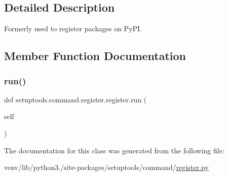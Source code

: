 \subsection{Detailed Description}
\begin{DoxyVerb}Formerly used to register packages on PyPI.\end{DoxyVerb}
 

\subsection{Member Function Documentation}
\mbox{\label{classsetuptools_1_1command_1_1register_1_1register_a621e5757f6735b719df3425069768eb9}} 
\subsubsection{\texorpdfstring{run()}{run()}}
{\footnotesize\ttfamily def setuptools.\+command.\+register.\+register.\+run (\begin{DoxyParamCaption}\item[{}]{self }\end{DoxyParamCaption})}



The documentation for this class was generated from the following file\+:\begin{DoxyCompactItemize}
\item 
venv/lib/python3./site-\/packages/setuptools/command/\hyperlink{command_2register_8py}{register.\+py}\end{DoxyCompactItemize}
